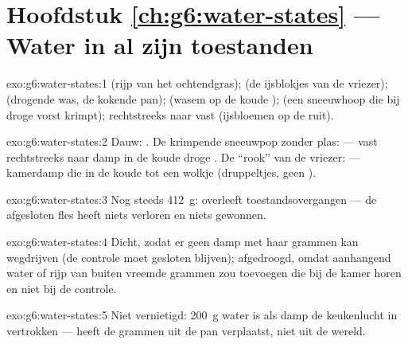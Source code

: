 \section*{Hoofdstuk \ref{ch:g6:water-states} --- Water in al zijn toestanden}

\begin{solution}{exo:g6:water-states:1}
 (rijp van het ochtendgras);  (de ijsblokjes van de
vriezer);  (drogende was, de kokende pan);
 (wasem op de koude );  (een
sneeuwhoop die bij droge vorst krimpt);  rechtstreeks naar
vast (ijsbloemen op de ruit).
\end{solution}

\begin{solution}{exo:g6:water-states:2}
Dauw: . De krimpende sneeuwpop zonder plas:
 --- vast rechtstreeks naar damp in de koude droge
. De ``rook'' van de vriezer:  --- kamerdamp die
in de koude  tot een wolkje  (druppeltjes, geen
).
\end{solution}

\begin{solution}{exo:g6:water-states:3}
Nog steeds \qty{412}{g}:  overleeft toestandsovergangen --- de
afgesloten fles heeft niets verloren en niets gewonnen.
\end{solution}

\begin{solution}{exo:g6:water-states:4}
Dicht, zodat er geen damp met haar grammen kan wegdrijven (de controle
moet gesloten blijven); afgedroogd, omdat aanhangend water of rijp van
buiten vreemde grammen zou toevoegen die bij de kamer horen en niet bij
de controle.
\end{solution}

\begin{solution}{exo:g6:water-states:5}
Niet vernietigd: \qty{200}{g} water is als damp de keukenlucht in
vertrokken ---  heeft de grammen uit de pan verplaatst, niet
uit de wereld.
\end{solution}

